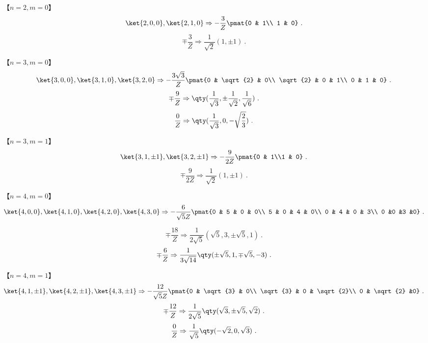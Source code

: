【$n=2, m=0$】
\begin{equation}
\ket{2,0,0},\ket{2,1,0} \Rightarrow-\frac{3}{Z}\pmat{0 & 1\\ 1 & 0}~.
\end{equation}
\begin{equation}
\mp\frac{3}{Z} \Rightarrow \frac{1}{\sqrt{2}}(1, \pm1)~.
\end{equation}

【$n=3, m=0$】
\begin{equation}
\ket{3,0,0},\ket{3,1,0},\ket{3,2,0}\Rightarrow
-\frac{3\sqrt{3}}{Z}\pmat{0 & \sqrt{2} & 0\\ \sqrt{2} & 0 & 1\\ 0 & 1 & 0}~.
\end{equation}
\begin{equation}
\mp\frac{9}{Z} \Rightarrow \qty(\frac{1}{\sqrt{3}}, \pm \frac{1}{\sqrt{2}}, \frac{1}{\sqrt{6}})~.
\end{equation}
\begin{equation}
\frac{0}{Z} \Rightarrow \qty(\frac{1}{\sqrt{3}}, 0, -\sqrt{\frac{2}{3}})~.
\end{equation}

【$n=3, m=1$】
\begin{equation}
\ket{3,1,\pm1},\ket{3,2,\pm1} \Rightarrow
-\frac{9}{2Z}\pmat{0 & 1\\1 & 0}~.
\end{equation}
\begin{equation}
\mp\frac{9}{2Z} \Rightarrow \frac{1}{\sqrt 2}(1, \pm 1)~.
\end{equation}

【$n=4, m=0$】
\begin{equation}
\ket{4,0,0},\ket{4,1,0},\ket{4,2,0},\ket{4,3,0} \Rightarrow -\frac{6}{\sqrt{5}Z}\pmat{0 & 5 & 0 & 0\\ 5 & 0 & 4 & 0\\ 0 & 4 & 0 & 3\\ 0 &0 &3 &0}~.
\end{equation}

\begin{equation}
\mp\frac{18}{Z} \Rightarrow \frac{1}{2\sqrt{5}}(\sqrt{5},3,\pm\sqrt{5},1)~.
\end{equation}
\begin{equation}
\mp\frac{6}{Z} \Rightarrow \frac{1}{3\sqrt{14}}\qty(\pm\sqrt{5}, 1,\mp\sqrt{5},-3)~.
\end{equation}

【$n=4, m=1$】
\begin{equation}
\ket{4,1,\pm1},\ket{4,2,\pm1},\ket{4,3,\pm1} \Rightarrow -\frac{12}{\sqrt{5}Z}\pmat{0 & \sqrt{3} & 0\\ \sqrt{3} & 0 & \sqrt{2}\\ 0 & \sqrt{2} &0}~.
\end{equation}
\begin{equation}
\mp\frac{12}{Z} \Rightarrow \frac{1}{2\sqrt{5}}\qty(\sqrt{3},\pm\sqrt{5},\sqrt{2})~.
\end{equation}
\begin{equation}
\frac{0}{Z} \Rightarrow \frac{1}{\sqrt{5}}\qty(-\sqrt{2},0,\sqrt{3})~.
\end{equation}

